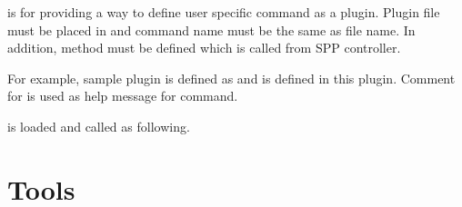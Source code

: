 \documentclass[a4paper,11pt,openany,oneside,english]{sphinxmanual}
\begin{document}
 is for providing a way to define user specific command
as a plugin.
Plugin file must be placed in  and
command name must be the same as file name.
In addition,  method must be defined which is called from
SPP controller.

For example,  sample plugin is defined as
 and  is defined
in this plugin.
Comment for  is used as help message for  command.

\begin{sphinxVerbatim}[commandchars=\\\{\},formatcom=\footnotesize]
  


       
          
\end{sphinxVerbatim}

 is loaded and called as following.

\begin{sphinxVerbatim}[commandchars=\\\{\},formatcom=\footnotesize]
\end{sphinxVerbatim}


\chapter{Tools}
\label{\detokenize{tools/index:tools}}\label{\detokenize{tools/index:tools-index}}\label{\detokenize{tools/index::doc}}
\end{document}
